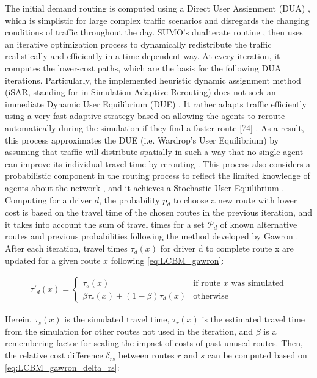 The initial demand routing is computed using a Direct User Assignment (DUA) \citep{GermanAerospaceCenterDLRandothers2021a}, which is simplistic for large complex traffic scenarios and disregards the changing conditions of traffic throughout the day. SUMO’s duaIterate routine \citep{GermanAerospaceCenterDLRandothers2021e}, then uses an iterative optimization process to dynamically redistribute the traffic realistically and efficiently in a time-dependent way. At every iteration, it computes the lower-cost paths, which are the basis for the following DUA iterations. Particularly, the implemented heuristic dynamic assignment method (iSAR, standing for in-Simulation Adaptive Rerouting) does not seek an immediate Dynamic User Equilibrium (DUE) \citep{GermanAerospaceCenterDLRandothers2021e}. It rather adapts traffic efficiently using a very fast adaptive strategy based on allowing the agents to reroute automatically during the simulation if they find a faster route [74] \citep{ArgotaSanchez-Vaquerizo2021}. As a result, this process approximates the DUE  (i.e. Wardrop’s User Equilibrium) by assuming that traffic will distribute spatially in such a way that no single agent can improve its individual travel time by rerouting \citep{Wardrop1952}. This process also considers a probabilistic component in the routing process to reflect the limited knowledge of agents about the network \citep{Daganzo1977}, and it achieves a Stochastic User Equilibrium \citep{Barcelo2006}. Computing for a driver $d$, the probability $p_d$ to choose a new route with lower cost is based on the travel time of the chosen routes in the previous iteration, and it takes into account the sum of travel times for a set $\mathcal{P}_d$ of known alternative routes and previous probabilities following the method developed by Gawron \citep{Gawron1999}. After each iteration, travel times $\tau_d (x)$  for driver d to complete route x are updated for a given route $x$ following \autoref{eq:LCBM_gawron}:

\begin{align}
   \tau'_d(x) = \begin{cases} \tau_s(x) & \text{if route } x \text{ was simulated} \\ \beta \tau_r(x) + (1 - \beta)\tau_d(x) & \text{otherwise} \end{cases} \label{eq:LCBM_gawron}
\end{align}

Herein, $\tau_s (x)$ is the simulated travel time, $\tau_r (x)$ is the estimated travel time from the simulation for other routes not used in the iteration, and $\beta$ is a remembering factor for scaling the impact of costs of past unused routes. Then, the relative cost difference $\delta_{rs}$ between routes $r$ and $s$ can be computed based on \autoref{eq:LCBM_gawron_delta_rs}:

